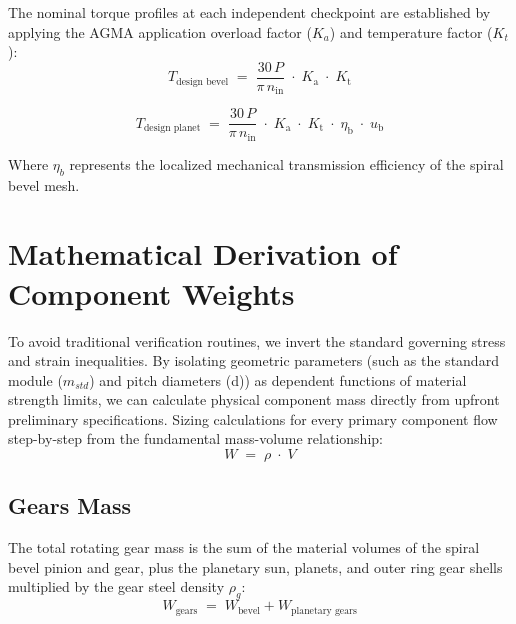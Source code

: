     The nominal torque profiles at each independent checkpoint are established by applying the AGMA 
    application overload factor ($K_{a}$) and temperature factor ($K_{t}$):
        \begin{equation}
            \label{eq:torquedesignbevela}
            T_{\text{design bevel}}
            \;=\;
            \frac{30\,P}{\pi\, n_{\text{in}}}
            \;\cdot\;
            K_{\text{a}}\;\cdot\;
            K_{\text{t}}
        \end{equation}    
 
        \begin{equation}
            \label{eq:torquedesignbevelb}
            T_{\text{design planet}}
            \;=\;
            \frac{30\,P}{\pi\, n_{\text{in}}}
            \;\cdot\;
            K_{\text{a}}\;\cdot\;
            K_{\text{t}}\;\cdot\;
            \eta_{\text{b}}\;\cdot\;
            u_{\text{b}}
        \end{equation}
    
    Where $\eta_{b}$ represents the localized mechanical transmission efficiency of the spiral bevel mesh.

\section{Mathematical Derivation of Component Weights}
    To avoid traditional  verification routines, we invert the standard governing stress 
    and strain inequalities. By isolating geometric parameters (such as the standard module ($m_{std}$) and 
    pitch diameters (d)) as dependent functions of material strength limits, we can calculate physical 
    component mass directly from upfront preliminary specifications. Sizing calculations for every primary 
    component flow step-by-step from the fundamental mass-volume relationship:
        \begin{equation}
            \label{eq:massvolume}
            W
            \;=\;
            \rho\;\cdot\;
            V
        \end{equation}

    \subsection{Gears Mass}
        The total rotating gear mass is the sum of the material volumes of the spiral bevel pinion and gear, 
        plus the planetary sun, planets, and outer ring gear shells multiplied by the gear steel density $\rho_{g}$:
            \begin{equation}
                \label{eq:steeldensity}
                W_{\text{gears}}
                \;=\;
                W_{\text{bevel}} + W_{\text{planetary gears}}
            \end{equation}
    

